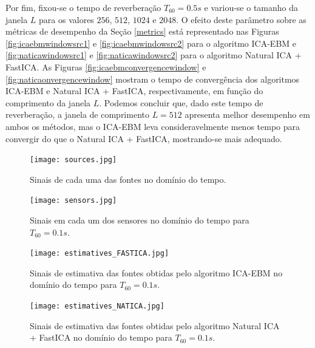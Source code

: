     Por fim, fixou-se o tempo de reverberação $T_{60}=0.5s$ e variou-se o tamanho da janela $L$ para os valores $256$, $512$, $1024$ e $2048$. O efeito deste parâmetro sobre as métricas de desempenho da Seção \ref{metrics} está representado nas Figuras \ref{fig:icaebmwindowsrc1} e \ref{fig:icaebmwindowsrc2} para o algoritmo ICA-EBM e \ref{fig:naticawindowsrc1} e \ref{fig:naticawindowsrc2} para o algoritmo Natural ICA + FastICA. As Figuras \ref{fig:icaebmconvergencewindow} e \ref{fig:naticaonvergencewindow} mostram o tempo de convergência dos algoritmos ICA-EBM e Natural ICA + FastICA, respectivamente, em função do comprimento da janela $L$. Podemos concluir que, dado este tempo de reverberação, a janela de comprimento $L=512$ apresenta melhor desempenho em ambos os métodos, mas o ICA-EBM leva consideravelmente menos tempo para convergir do que o Natural ICA + FastICA, mostrando-se mais adequado.
    
    \begin{figure}
        \centering
        \texttt{[image: sources.jpg]}
            \caption{Sinais de cada uma das fontes no domínio do tempo.}
        \label{fig:sources}
        \texttt{[image: sensors.jpg]}
            \caption{Sinais em cada um dos sensores no domínio do tempo para $T_{60} = 0.1s$.}
        \label{fig:sensors}
    \end{figure}
    
    \begin{figure}
        \centering
        \texttt{[image: estimatives\_FASTICA.jpg]}
        \caption{Sinais de estimativa das fontes obtidas pelo algoritmo ICA-EBM no domínio do tempo para $T_{60} = 0.1s$.}
        \label{fig:icaebm}
        \texttt{[image: estimatives\_NATICA.jpg]}
        \caption{Sinais de estimativa das fontes obtidas pelo algoritmo Natural ICA + FastICA  no domínio do tempo para $T_{60} = 0.1s$.}
        \label{fig:natica}
    \end{figure}
    
